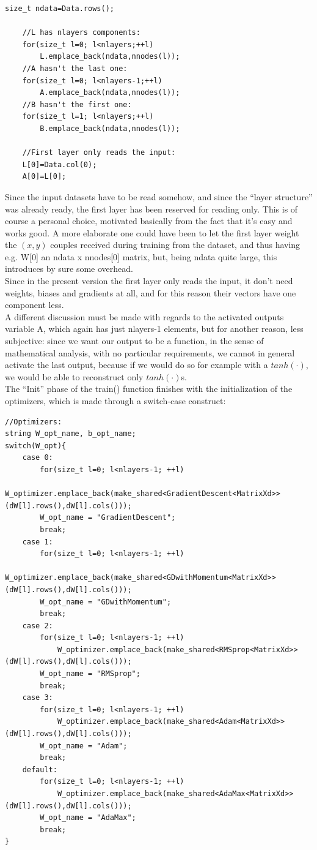 \documentclass[12pt, a4paper]{report}
\theoremstyle{definition}
\begin{document}
{\begin{lstlisting}[frame=single, showstringspaces=false]
	size_t ndata=Data.rows();

	//L has nlayers components:
	for(size_t l=0; l<nlayers;++l)
		L.emplace_back(ndata,nnodes(l));
	//A hasn't the last one:
	for(size_t l=0; l<nlayers-1;++l)
		A.emplace_back(ndata,nnodes(l));
	//B hasn't the first one:
	for(size_t l=1; l<nlayers;++l)
		B.emplace_back(ndata,nnodes(l));

	//First layer only reads the input:
	L[0]=Data.col(0); 
	A[0]=L[0];	
\end{lstlisting}
Since the input datasets have to be read somehow, and since the ``layer structure'' was already ready, the first layer has been reserved for reading only. This is of course a personal choice, motivated basically from the fact that it's easy and works good. A more elaborate one could have been to let the first layer weight the $(x,y)$ couples received during training from the dataset, and thus having e.g. {\ttfamily W[0]} an {\ttfamily ndata x nnodes[0]} matrix, but, being {\ttfamily ndata} quite large, this introduces by sure some overhead.\\
Since in the present version the first layer only reads the input, it don't need weights, biases and gradients at all, and for this reason their vectors have one component less.\\
A different discussion must be made with regards to the activated outputs variable {\ttfamily A}, which again has just {\ttfamily nlayers-1} elements, but for another reason, less subjective: since we want our output to be a function, in the sense of mathematical analysis, with no particular requirements, we cannot in general activate the last output, because if we would do so for example with a $tanh(\cdot)$, we would be able to reconstruct only $tanh(\cdot)$s.\\
The ``Init'' phase of the {\ttfamily train()} function finishes with the initialization of the optimizers, which is made through a switch-case construct:
\begin{lstlisting}[frame=single]
//Optimizers:
string W_opt_name, b_opt_name;
switch(W_opt){
	case 0:
		for(size_t l=0; l<nlayers-1; ++l)
			W_optimizer.emplace_back(make_shared<GradientDescent<MatrixXd>>(dW[l].rows(),dW[l].cols()));
		W_opt_name = "GradientDescent";
		break;
	case 1:
		for(size_t l=0; l<nlayers-1; ++l)
			W_optimizer.emplace_back(make_shared<GDwithMomentum<MatrixXd>>(dW[l].rows(),dW[l].cols()));
		W_opt_name = "GDwithMomentum";
		break;
	case 2:
		for(size_t l=0; l<nlayers-1; ++l)
			W_optimizer.emplace_back(make_shared<RMSprop<MatrixXd>>(dW[l].rows(),dW[l].cols()));
		W_opt_name = "RMSprop";
		break;
	case 3:
		for(size_t l=0; l<nlayers-1; ++l)
			W_optimizer.emplace_back(make_shared<Adam<MatrixXd>>(dW[l].rows(),dW[l].cols()));
		W_opt_name = "Adam";
		break;
	default:
		for(size_t l=0; l<nlayers-1; ++l)
			W_optimizer.emplace_back(make_shared<AdaMax<MatrixXd>>(dW[l].rows(),dW[l].cols()));
		W_opt_name = "AdaMax";
		break;
}		
	

\end{lstlisting}}
\end{document}
